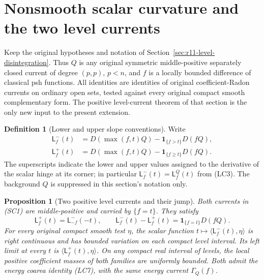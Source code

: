 \documentclass[11pt,a4paper]{article}
\numberwithin{equation}{section}
\newtheorem{proposition}[theorem]{Proposition}
\theoremstyle{definition}
\newtheorem{definition}[theorem]{Definition}
\theoremstyle{remark}
\begin{document}


\section{Nonsmooth scalar curvature and the two level currents}
\label{sec:r11-nonsmooth-scalar-curvature}

Keep the original hypotheses and notation of
Section~\ref{sec:r11-level-disintegration}.  Thus $Q$ is any
original symmetric middle-positive separately closed current of
degree $(p,p)$, $p<n$, and $f$ is a locally bounded difference
of classical psh functions.  All identities are identities of
original coefficient-Radon currents on ordinary open sets, tested
against every original compact smooth complementary form.  The
positive level-current theorem of that section is the only new
input to the present extension.

\begin{definition}[Lower and upper slope conventions]
Write
\[
 \begin{split}
 \mathsf L_f^{-}(t)
    &=D(\max(f,t)Q)-\mathbf1_{\{f>t\}}D(fQ),\\
 \mathsf L_f^{+}(t)
    &=D(\max(f,t)Q)-\mathbf1_{\{f\geq t\}}D(fQ).
 \end{split}
 \tag{SC1}
\]
The superscripts indicate the lower and upper values assigned to
the derivative of the scalar hinge at its corner; in particular
$\mathsf L_f^{-}(t)=\mathsf L_f^Q(t)$ from (LC3).
The background $Q$ is suppressed in this section's notation only.
\end{definition}

\begin{proposition}[Two positive level currents and their jump]
\label{prop:r11-two-level-currents}
Both currents in (SC1) are middle-positive and carried by
$\{f=t\}$.  They satisfy
\[
 \mathsf L_f^{+}(t)=\mathsf L_{-f}^{-}(-t),\qquad
 \mathsf L_f^{-}(t)-\mathsf L_f^{+}(t)
                      =\mathbf1_{\{f=t\}}D(fQ).
 \tag{SC2}
\]
For every original compact smooth test $\eta$, the scalar function
$t\mapsto\langle\mathsf L_f^{-}(t),\eta\rangle$ is right
continuous and has bounded variation on each compact level interval.
Its left limit at every $t$ is
$\langle\mathsf L_f^{+}(t),\eta\rangle$.  On any compact real
interval of levels, the local positive coefficient masses of both
families are uniformly bounded.  Both admit the energy coarea
identity (LC7), with the same energy current $\Gamma_Q(f)$.
\end{proposition}
\end{document}
